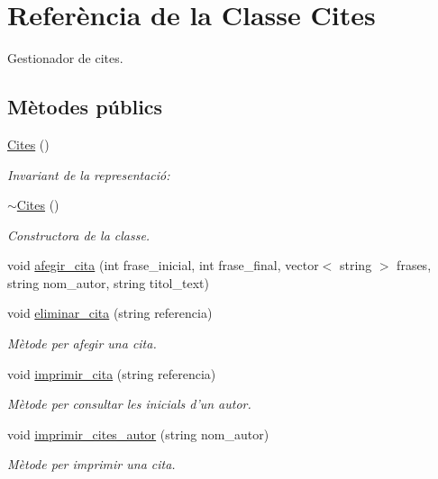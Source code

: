 \hypertarget{class_cites}{\section{Referència de la Classe Cites}
\label{class_cites}
}


Gestionador de cites.  


\subsection*{Mètodes públics}
\begin{DoxyCompactItemize}
\item 
\hyperlink{class_cites_aef7c40360c5537b4dac136a758e815fc}{Cites} ()
\begin{DoxyCompactList}\small\item\em Invariant de la representació\+: \end{DoxyCompactList}\item 
\hyperlink{class_cites_a7cbea31abf7bb3aeaae56592545c2390}{$\sim$\+Cites} ()
\begin{DoxyCompactList}\small\item\em Constructora de la classe. \end{DoxyCompactList}\item 
void \hyperlink{class_cites_a66ce36e7002b77e08ab58c865c6538dd}{afegir\+\_\+cita} (int frase\+\_\+inicial, int frase\+\_\+final, vector$<$ string $>$ frases, string nom\+\_\+autor, string titol\+\_\+text)
\item 
void \hyperlink{class_cites_a001083c304cb7d6305bde75dd4cb28fe}{eliminar\+\_\+cita} (string referencia)
\begin{DoxyCompactList}\small\item\em Mètode per afegir una cita. \end{DoxyCompactList}\item 
void \hyperlink{class_cites_af2f27446487bb2763199cf35e45bc9b3}{imprimir\+\_\+cita} (string referencia)
\begin{DoxyCompactList}\small\item\em Mètode per consultar les inicials d'un autor. \end{DoxyCompactList}\item 
void \hyperlink{class_cites_a780d46001297c44f21f0acc827ffe651}{imprimir\+\_\+cites\+\_\+autor} (string nom\+\_\+autor)
\begin{DoxyCompactList}\small\item\em Mètode per imprimir una cita. \end{DoxyCompactList}\item 

\end{DoxyCompactItemize}
